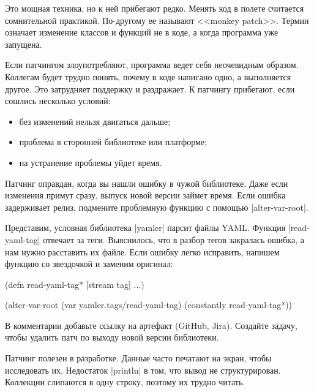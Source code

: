 Это мощная техника, но к ней прибегают редко. Менять код в полете считается
сомнительной практикой. По-другому ее называют <<monkey
patch>>. Термин означает
изменение классов и функций не в коде, а когда программа уже запущена.

Если патчингом злоупотребляют, программа ведет себя неочевидным
образом. Коллегам будет трудно понять, почему в коде написано одно, а
выполняется другое. Это затрудняет поддержку и раздражает. К патчингу прибегают,
если сошлись несколько условий:

\begin{itemize}

\item
  без изменений нельзя двигаться дальше;

\item
  проблема в сторонней библиотеке или платформе;

\item
  на устранение проблемы уйдет время.

\end{itemize}

Патчинг оправдан, когда вы нашли ошибку в чужой библиотеке. Даже если изменения
примут сразу, выпуск новой версии займет время. Если ошибка задерживает релиз,
подмените проблемную функцию с помощью \spverb|alter-var-root|.

Представим, условная библиотека \spverb|yamler| парсит файлы YAML. Функция
\spverb|read-yaml-tag| отвечает за теги. Выяснилось, что в разбор тегов
закралась ошибка, а нам нужно расставить их файле. Если ошибку легко исправить,
напишем функцию со звездочкой и заменим оригинал:

\begin{english}
  \begin{clojure}
(defn read-yaml-tag* [stream tag]
  ...)

(alter-var-root
 (var yamler.tags/read-yaml-tag)
 (constantly read-yaml-tag*))
  \end{clojure}
\end{english}

В комментарии добавьте ссылку на артефакт (GitHub, Jira). Создайте задачу,
чтобы удалить патч по выходу новой версии библиотеки.

Патчинг полезен в разработке. Данные часто печатают на экран, чтобы исследовать
их. Недостаток \spverb|println| в том, что вывод не структурирован. Коллекции
слипаются в одну строку, поэтому их трудно читать.

